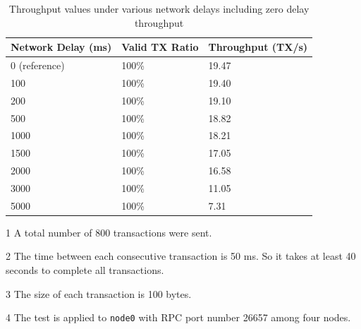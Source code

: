 \documentclass{article}
\begin{document}
\begin{table}[ht]
    \begin{threeparttable}
        \caption{Throughput values under various network delays including zero delay throughput}
        \centering
        \begin{tabular}{|l|l|l|}
            \hline
            \textbf{Network Delay (ms)} & \textbf{Valid TX Ratio} & \textbf{Throughput (TX/s)} \\ \hline
            0 (reference)               & 100\%                   & 19.47                       \\ \hline
            100                         & 100\%                   & 19.40                       \\ \hline
            200                         & 100\%                   & 19.10                       \\ \hline
            500                         & 100\%                   & 18.82                       \\ \hline
            1000                        & 100\%                   & 18.21                       \\ \hline
            1500                        & 100\%                   & 17.05                       \\ \hline
            2000                        & 100\%                   & 16.58                       \\ \hline
            3000                        & 100\%                   & 11.05                       \\ \hline
            5000                        & 100\%                   & 7.31                       \\ \hline
        \end{tabular}
        \label{tab:Network delay throughput for larger time duration}
        \begin{tablenotes}
            \item[1] A total number of 800 transactions were sent.
            \item[2] The time between each consecutive transaction is 50 ms. So it takes at least 40 seconds to complete all transactions.
            \item[3] The size of each transaction is 100 bytes.
            \item[4] The test is applied to \texttt{node0} with RPC port number 26657 among four nodes.
        \end{tablenotes}
    \end{threeparttable}
\end{table}
\end{document}
